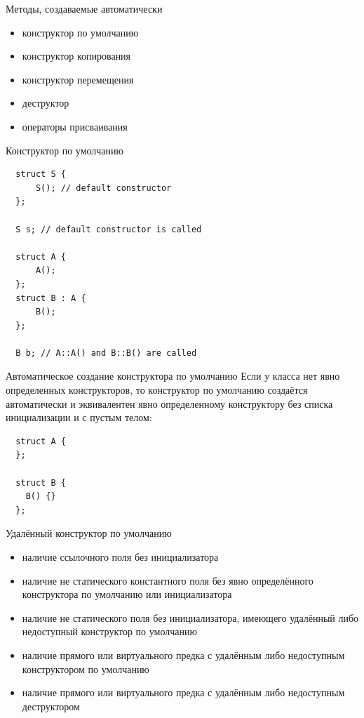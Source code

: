 \documentclass[unknownkeysallowed,xcolor=table]{beamer}
\begin{document}
\begin{frame}{Методы, создаваемые автоматически}
  \begin{itemize}
    \item конструктор по умолчанию \vspace{1em}
    \item конструктор копирования \vspace{1em}
    \item конструктор перемещения \vspace{1em}
    \item деструктор \vspace{1em}
    \item операторы присваивания
  \end{itemize}
\end{frame}

\begin{frame}[fragile]{Конструктор по умолчанию}
  \begin{lstlisting}
  struct S {
      S(); // default constructor
  };

  S s; // default constructor is called

  struct A {
      A();
  };
  struct B : A {
      B();
  };

  B b; // A::A() and B::B() are called
  \end{lstlisting}
\end{frame}

\begin{frame}[fragile]{Автоматическое создание конструктора по умолчанию}
  Если у класса нет явно определенных конструкторов, то конструктор по умолчанию создаётся автоматически и эквивалентен явно определенному конструктору без списка инициализации и с пустым телом:
  \begin{lstlisting}
  struct A {
  };

  struct B {
    B() {}
  };
  \end{lstlisting}
\end{frame}

\begin{frame}{Удалённый конструктор по умолчанию}
  \begin{itemize}
    \item наличие ссылочного поля без инициализатора \vspace{0.5em}
    \item наличие не статического константного поля без явно определённого конструктора по умолчанию или инициализатора \vspace{0.5em}
    \item наличие не статического поля без инициализатора, имеющего удалённый либо недоступный конструктор по умолчанию \vspace{0.5em}
    \item наличие прямого или виртуального предка с удалённым либо недоступным конструктором по умолчанию \vspace{0.5em}
    \item наличие прямого или виртуального предка с удалённым либо недоступным деструктором
  \end{itemize}
\end{frame}
\end{document}
